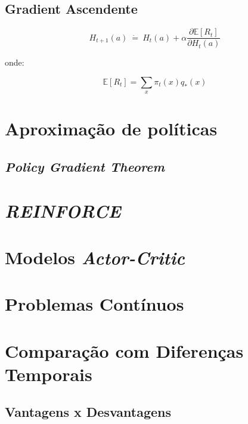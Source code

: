 \documentclass{article}
\begin{document}
    \subsection{Gradient Ascendente}
    
        \begin{equation}
            H_{t+1}(a) \ \dot{=} \ H_t(a) + \alpha \frac{\partial \mathbb{E}[R_t]}{\partial H_t(a)}
        \end{equation}
        
        onde:
        
        \begin{equation}
            \mathbb{E}[R_t] = \sum_x \pi_t(x) q_*(x)
        \end{equation}
    
\section{Aproximação de políticas}

    \subsection{\emph{Policy Gradient Theorem}}
    
\section{\emph{REINFORCE}}

\section{Modelos \emph{Actor-Critic}}

\section{Problemas Contínuos}

\section{Comparação com Diferenças Temporais}

    \subsection{Vantagens x Desvantagens}
    
\end{document}

